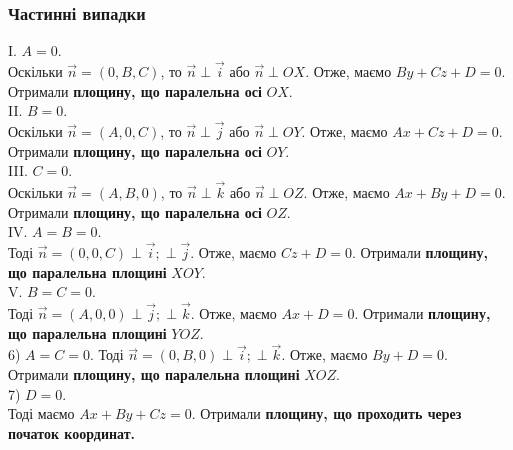 \documentclass[a4paper, 10pt]{extarticle}
\theoremstyle{theoremdd}
\theoremstyle{theoremdd}
\theoremstyle{theoremdd}
\theoremstyle{theoremdd}
\theoremstyle{theoremdd}
\theoremstyle{theoremdd}
\theoremstyle{theoremdd}
\theoremstyle{theoremdd}
\begin{document}
\subsubsection*{Частинні випадки}
I. $A = 0$.\\
Оскільки $\vec{n} = (0,B,C)$, то $\vec{n} \perp \vec{i}$ або $\vec{n} \perp OX$. Отже, маємо $By + Cz + D = 0$. Отримали \textbf{площину, що паралельна осі} $OX$.
\bigskip \\
II. $B = 0$.\\
Оскільки $\vec{n} = (A,0,C)$, то $\vec{n} \perp \vec{j}$ або $\vec{n} \perp OY$. Отже, маємо $Ax + Cz + D = 0$. Отримали \textbf{площину, що паралельна осі} $OY$.
\bigskip \\
III. $C = 0$.\\
Оскільки $\vec{n} = (A,B,0)$, то $\vec{n} \perp \vec{k}$ або $\vec{n} \perp OZ$. Отже, маємо $Ax + By + D = 0$. Отримали \textbf{площину, що паралельна осі} $OZ$.
\bigskip \\
IV. $A=B=0$.\\
Тоді $\vec{n} = (0,0,C) \perp \vec{i}; \perp \vec{j}$. Отже, маємо $Cz + D = 0$. Отримали \textbf{площину, що паралельна площині} $XOY$.
\bigskip \\
V. $B=C=0$.\\
Тоді $\vec{n} = (A,0,0) \perp \vec{j}; \perp \vec{k}$. Отже, маємо $Ax + D = 0$. Отримали \textbf{площину, що паралельна площині} $YOZ$.
\bigskip \\
6) $A=C=0$.
Тоді $\vec{n} = (0,B,0) \perp \vec{i}; \perp \vec{k}$. Отже, маємо $By + D = 0$. Отримали \textbf{площину, що паралельна площині} $XOZ$.
\bigskip \\
7) $D = 0$.\\
Тоді маємо $Ax + By + Cz = 0$. Отримали \textbf{площину, що проходить через початок координат.}
\end{document}
